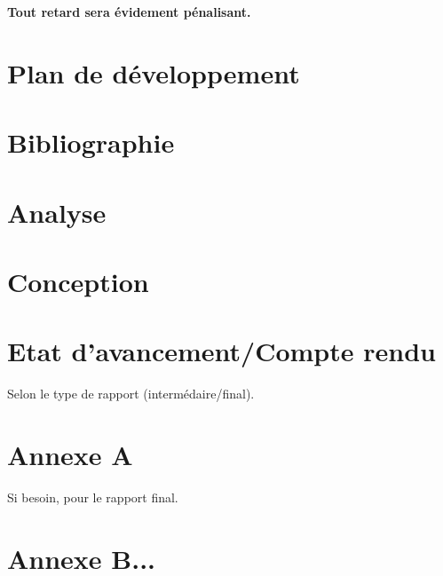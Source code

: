 \documentclass[a4paper,12pt]{article}
\begin{document}
\textbf{Tout retard sera évidement pénalisant. }

\section{Plan de développement}


\section{Bibliographie}


\section{Analyse}


\section{Conception}


\section{Etat d'avancement/Compte rendu}
Selon le type de rapport (intermédaire/final).


\section{Annexe A}
Si besoin, pour le rapport final.


\section{Annexe B...}



\label{fin}
\end{document}
